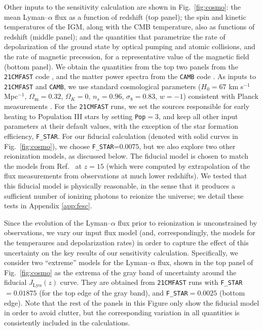 \documentclass[aps,prd,twocolumn,floatfix,showpacs,superscriptaddress,nofootinbib]{revtex4-1}
\begin{document}
Other inputs to the sensitivity calculation are shown in Fig.~\ref{fig:cosmo}: the mean Lyman--$\alpha$ flux as a function of redshift (top panel); the spin and kinetic temperatures of the IGM, along with the CMB temperature, also as functions of redshift (middle panel); and the quantities that parametrize the rate of depolarization of the ground state by optical pumping and atomic collisions, and the rate of magnetic precession, for a representative value of the magnetic field (bottom panel). We obtain the quantities from the top two panels from the \texttt{21CMFAST} code \cite{2011MNRAS.411..955M}, and the matter power spectra from the \texttt{CAMB} code \cite{2000ApJ...538..473L}. As inputs to \texttt{21CMFAST} and \texttt{CAMB}, we use standard cosmological parameters ($H_0=67$ km s$^{-1}$ Mpc$^{-1}$, $\Omega_\text{m}=0.32$, $\Omega_K=0$, $n_s=0.96$, $\sigma_8=0.83$, $w=-1$) consistent with Planck measurements \cite{2015arXiv150201589P}. For the \texttt{21CMFAST} runs, we set the sources responsible for early heating to Population III stars by setting \verb|Pop|$=3$, and keep all other input parameters at their default values, with the exception of the star formation efficiency, \verb|F_STAR|. For our fiducial calculation (denoted with solid curves in Fig.~\ref{fig:cosmo}), we choose \verb|F_STAR|=$0.0075$, but we also explore two other reionization models, as discussed below. The fiducial model is chosen to match the models from Ref.~\cite{2012ApJ...746..125H} at $z=15$ (which were computed by extrapolation of the flux measurements from observations at much lower redshifts). We tested that this fiducial model is physically reasonable, in the sense that it produces a sufficient number of ionizing photons to reionize the universe; we detail these tests in Appendix \ref{app:fesc}. 

Since the evolution of the Lyman--$\alpha$ flux prior to reionization is unconstrained by observations, we vary our input flux model (and, correspondingly, the models for the temperaures and depolarization rates) in order to capture the effect of this uncertainty on the key results of our sensitivity calculation. Specifically, we consider two ``extreme'' models for the Lyman--$\alpha$ flux, shown in the top panel of Fig.~\ref{fig:cosmo} as the extrema of the gray band of uncertainty around the fiducial $J_{\text{Ly}\alpha}(z)$ curve. They are obtained from \texttt{21CMFAST} runs with \verb|F_STAR|$=0.01875$  (for the top edge of the gray band), and \verb|F_STAR|$=0.0025$ (bottom edge).  Note that the rest of the panels in this Figure only show the fiducial model in order to avoid clutter, but the corresponding variation in all quantities is consistently included in the calculations. 
\end{document}
